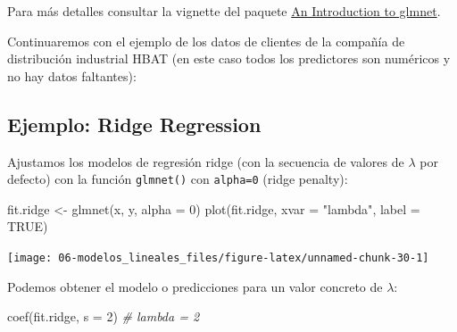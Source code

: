\documentclass[
]{book}
\newenvironment{Shaded}{\begin{snugshade}}{\end{snugshade}}
\newcommand{\AttributeTok}[1]{\textcolor[rgb]{0.77,0.63,0.00}{#1}}
\newcommand{\CommentTok}[1]{\textcolor[rgb]{0.56,0.35,0.01}{\textit{#1}}}
\newcommand{\ConstantTok}[1]{\textcolor[rgb]{0.00,0.00,0.00}{#1}}
\newcommand{\DecValTok}[1]{\textcolor[rgb]{0.00,0.00,0.81}{#1}}
\newcommand{\FunctionTok}[1]{\textcolor[rgb]{0.00,0.00,0.00}{#1}}
\newcommand{\NormalTok}[1]{#1}
\newcommand{\OtherTok}[1]{\textcolor[rgb]{0.56,0.35,0.01}{#1}}
\newcommand{\SpecialCharTok}[1]{\textcolor[rgb]{0.00,0.00,0.00}{#1}}
\newcommand{\StringTok}[1]{\textcolor[rgb]{0.31,0.60,0.02}{#1}}
\theoremstyle{break}
\theoremstyle{definition}
\theoremstyle{definition}
\theoremstyle{definition}
\theoremstyle{definition}
\theoremstyle{remark}
\begin{document}
Para más detalles consultar la vignette del paquete \href{https://glmnet.stanford.edu/articles/glmnet.html}{An Introduction to glmnet}.

Continuaremos con el ejemplo de los datos de clientes de la compañía de distribución industrial HBAT (en este caso todos los predictores son numéricos y no hay datos faltantes):

\begin{Shaded}
\end{Shaded}

\hypertarget{ejemplo-ridge-regression}{%
\subsection{Ejemplo: Ridge Regression}\label{ejemplo-ridge-regression}}

Ajustamos los modelos de regresión ridge (con la secuencia de valores de \(\lambda\) por defecto) con la función \texttt{glmnet()} con \texttt{alpha=0} (ridge penalty):

\begin{Shaded}
\begin{Highlighting}[]
\NormalTok{fit.ridge }\OtherTok{\textless{}{-}} \FunctionTok{glmnet}\NormalTok{(x, y, }\AttributeTok{alpha =} \DecValTok{0}\NormalTok{)}
\FunctionTok{plot}\NormalTok{(fit.ridge, }\AttributeTok{xvar =} \StringTok{"lambda"}\NormalTok{, }\AttributeTok{label =} \ConstantTok{TRUE}\NormalTok{)}
\end{Highlighting}
\end{Shaded}

\begin{center}\texttt{[image: 06-modelos\_lineales\_files/figure-latex/unnamed-chunk-30-1]} \end{center}

Podemos obtener el modelo o predicciones para un valor concreto de \(\lambda\):

\begin{Shaded}
\begin{Highlighting}[]
\FunctionTok{coef}\NormalTok{(fit.ridge, }\AttributeTok{s =} \DecValTok{2}\NormalTok{) }\CommentTok{\# lambda = 2}
\end{Highlighting}
\end{Shaded}
\end{document}
